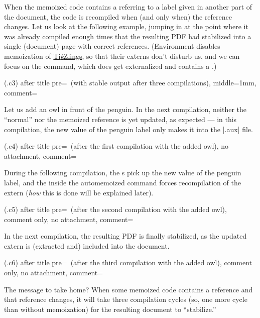 \documentclass[a4paper,11pt]{article}
\begin{document}
When the memoized code contains a  referring to a label given in another
part of the document, the code is recompiled when (and only when) the reference
changes.  Let us look at the following example, jumping in at the point where
it was already compiled enough times that the resulting PDF had stabilized into
a single (document) page with correct references.  (Environment
 disables memoization
of \href{https://ctan.org/pkg/tikzlings}{Ti\emph{k}Zlings}, so that their
externs don't disturb us, and we can focus on the  command, which does
get externalized and contains a .)

(.c3){
  after title pre={\ (with stable output after three compilations)},
  middle=1mm,
  comment={\centering
  }
}

Let us add an owl in front of the penguin.  In the next compilation, neither
the ``normal'' nor the memoized reference is yet updated, as expected --- in
this compilation, the new value of the penguin label only makes it into the
|.aux| file.

(.c4){
  after title pre={\ (after the first compilation with the added owl)},
  no attachment,
  comment={\centering
  }
}

During the following compilation, the s pick up the new value of the
penguin label, and the  inside the automemoized  command
forces recompilation of the extern (\emph{how} this is done will be explained
later).

(.c5){
  after title pre={\ (after the second compilation with the added owl)},
  comment only, no attachment,
  comment={\centering
    \quad
  }
}

In the next compilation, the resulting PDF is finally stabilized, as the
updated extern is (extracted and) included into the document.  

(.c6){
  after title pre={\ (after the third compilation with the added owl)},
  comment only, no attachment,
  comment={\centering
  }
}

The message to take home?  When some memoized code contains a reference and
that reference changes, it will take three compilation cycles (so, one more
cycle than without memoization) for the resulting document to ``stabilize.''
\end{document}

